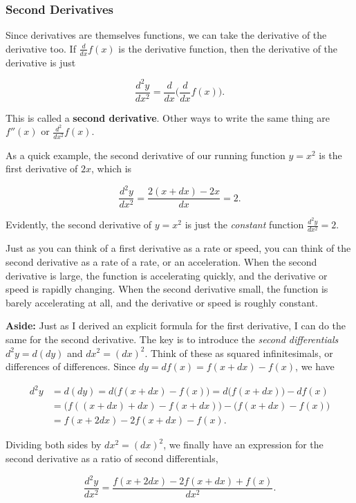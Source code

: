 \documentclass[
  letterpaper,
  DIV=11,
  numbers=noendperiod]{scrreprt}
\begin{document}
\hypertarget{second-derivatives}{%
\subsubsection{Second Derivatives}\label{second-derivatives}}

Since derivatives are themselves functions, we can take the derivative
of the derivative too. If \(\frac{d}{dx}f(x)\) is the derivative
function, then the derivative of the derivative is just

\[\frac{d^2 y}{dx^2} = \frac{d}{dx} \bigg(\frac{d}{dx} f(x)\bigg).\]

This is called a \textbf{second derivative}. Other ways to write the
same thing are \(f''(x)\) or \(\frac{d^2}{dx^2} f(x)\).

As a quick example, the second derivative of our running function
\(y=x^2\) is the first derivative of \(2x\), which is

\[\frac{d^2 y}{dx^2} = \frac{2(x + dx) - 2x}{dx} = 2.\]

Evidently, the second derivative of \(y=x^2\) is just the
\emph{constant} function \(\frac{d^2 y}{dx^2}=2\).

Just as you can think of a first derivative as a rate or speed, you can
think of the second derivative as a rate of a rate, or an acceleration.
When the second derivative is large, the function is accelerating
quickly, and the derivative or speed is rapidly changing. When the
second derivative small, the function is barely accelerating at all, and
the derivative or speed is roughly constant.

\textbf{Aside:} Just as I derived an explicit formula for the first
derivative, I can do the same for the second derivative. The key is to
introduce the \emph{second differentials} \(d^2y = d(dy)\) and
\(dx^2=(dx)^2\). Think of these as squared infinitesimals, or
differences of differences. Since \(dy = df(x) = f(x+dx) - f(x)\), we
have

\begin{align*}
d^2 y &= d(dy) = d\big(f(x+dx) - f(x)\big) = d\big(f(x+dx)\big) - df(x) \\
&= \big(f((x+dx)+dx)-f(x+dx)\big) - \big(f(x+dx)-f(x)\big) \\
&= f(x+2dx)-2f(x+dx)-f(x).
\end{align*}

Dividing both sides by \(dx^2=(dx)^2\), we finally have an expression
for the second derivative as a ratio of second differentials,

\[\frac{d^2 y}{dx^2} = \frac{f(x+2dx) - 2f(x+dx) + f(x)}{dx^2}.\]
\end{document}
